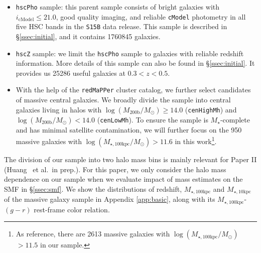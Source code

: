 \documentclass[a4paper,fleqn,usenatbib]{mnras}
\def\etal{{\ et al.~}}
\def\redm{\texttt{redMaPPer}}
\def\rbcg{\texttt{cenHighMh}}
\def\nbcg{\texttt{cenLowMh}}
\def\mstar{{$M_{\star}$}}
\def\logmh{{$\log (M_{\mathrm{200b}}/M_{\odot})$}}
\def\minn{{$M_{\star,10\mathrm{kpc}}$}}
\def\mtot{{$M_{\star,100\mathrm{kpc}}$}}
\def\logmtot{{$\log (M_{\star,100\mathrm{kpc}}/M_{\odot})$}}
\begin{document}
    \begin{itemize}
        \item \texttt{hscPho} sample: this parent sample consists of bright galaxies 
            with $i_{\mathrm{cModel}} \leq 21.0$, good quality imaging, and reliable 
            \texttt{cModel} photometry in all five HSC bands in the \texttt{S15B} 
            data release. 
            This sample is described in \S \ref{ssec:initial}, and it contains 
            1760845 galaxies. 
        \item \texttt{hscZ} sample: we limit the \texttt{hscPho} sample to galaxies 
            with reliable redshift information. 
            More details of this sample can also be found in \S \ref{ssec:initial}. 
            It provides us 25286 useful galaxies at $0.3<z<0.5$.
        \item With the help of the \redm{} cluster catalog, we further select 
            candidates of massive central galaxies.
            We broadly divide the sample into central galaxies living in halos
            with \logmh{}$\geq 14.0$ (\rbcg{}) and \logmh{}$<14.0$ (\nbcg{}).
            To ensure the sample is \mstar{}-complete and has minimal satellite 
            contamination, we will further focus on the 950 massive galaxies with 
            \logmtot{}$>11.6$ in this work\footnote{As reference, there are 
            2613 massive galaxies with \logmtot{}$>11.5$ in our sample.}. 
           
    \end{itemize}
    
    The division of our sample into two halo mass bins is mainly relevant for Paper II
    (Huang \etal in prep.).  
    For this paper, we only consider the halo mass dependence on our sample when we 
    evaluate impact of mass estimates on the SMF in \S \ref{ssec:smf}. 
    We show the distributions of redshift, \mtot{} and \minn{} of the massive galaxy 
    sample in Appendix \ref{app:basic}, along with its \mtot{}-$(g-r)$ rest-frame 
    color relation.

\end{document}
